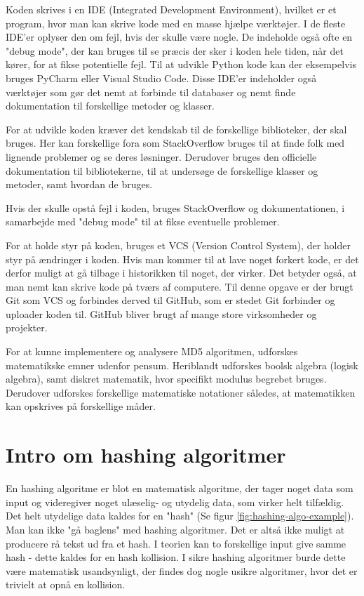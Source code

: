 \documentclass[12pt]{article}
\begin{document}
Koden skrives i en IDE (Integrated Development Environment), hvilket er et program, hvor man kan skrive kode med en masse hjælpe værktøjer. I de fleste IDE'er oplyser den om fejl, hvis der skulle være nogle. De indeholde også ofte en "debug mode", der kan bruges til se præcis der sker i koden hele tiden, når det kører, for at fikse potentielle fejl. Til at udvikle Python kode kan der eksempelvis bruges PyCharm eller Visual Studio Code. Disse IDE'er indeholder også værktøjer som gør det nemt at forbinde til databaser og nemt finde dokumentation til forskellige metoder og klasser.  

For at udvikle koden kræver det kendskab til de forskellige biblioteker, der skal bruges. Her kan forskellige fora som StackOverflow bruges til at finde folk med lignende problemer og se deres løsninger. Derudover bruges den officielle dokumentation til bibliotekerne, til at undersøge de forskellige klasser og metoder, samt hvordan de bruges. 

Hvis der skulle opstå fejl i koden, bruges StackOverflow og dokumentationen, i samarbejde med "debug mode" til at fikse eventuelle problemer. 

For at holde styr på koden, bruges et VCS (Version Control System), der holder styr på ændringer i koden. Hvis man kommer til at lave noget forkert kode, er det derfor muligt at gå tilbage i historikken til noget, der virker. Det betyder også, at man nemt kan skrive kode på tværs af computere. Til denne opgave er der brugt Git som VCS og forbindes derved til GitHub, som er stedet Git forbinder og uploader koden til. GitHub bliver brugt af mange store virksomheder og projekter. 

For at kunne implementere og analysere MD5 algoritmen, udforskes matematikske emner udenfor pensum. Heriblandt udforskes boolsk algebra (logisk algebra), samt diskret matematik, hvor specifikt modulus begrebet bruges. Derudover udforskes forskellige matematiske notationer således, at matematikken kan opskrives på forskellige måder. 

\section{Intro om hashing algoritmer}
En hashing algoritme er blot en matematisk algoritme, der tager noget data som input og videregiver noget ulæselig- og utydelig data, som virker helt tilfældig. 
Det helt utydelige data kaldes for en "hash" (Se figur \ref{fig:hashing-algo-example}). 
Man kan ikke "gå baglens" med hashing algoritmer. 
Det er altså ikke muligt at producere rå tekst ud fra et hash. I teorien kan to forskellige input give samme hash - dette kaldes for en hash kollision. I sikre hashing algoritmer burde dette være matematisk usandsynligt, der findes dog nogle usikre algoritmer, hvor det er trivielt at opnå en kollision.
\end{document}
